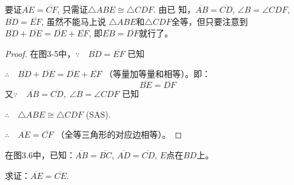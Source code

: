 \begin{analyze}
    要证$\overline{AE}=\overline{CF}$, 只需证$\triangle ABE\cong \triangle CDF$. 由已
知，$\overline{AB}=\overline{CD}$, $\angle B=\angle CDF$, $\overline{BD}=\overline{EF}$, 虽然不能马上说
$\triangle ABE$和$\triangle CDF$全等，但只要注意到$\overline{BD}+\overline{DE}=\overline{DE}+\overline{EF}$, 
即$\overline{EB}=\overline{DF}$就行了。
\end{analyze}

\begin{proof}
    在图3-5中，$\because\quad \overline{BD}=\overline{EF}$ 已知

$\therefore\quad \overline{BD}+\overline{DE}=\overline{DE}+\overline{EF}$ （等量加等量和相等）。即：
\[\overline{BE}=\overline{DF}\]
又$\because\quad \overline{AB}=\overline{CD},\; \angle B =\angle CDF$ 已知

$\therefore\quad \triangle ABE\cong \triangle CDF$ (SAS).

$\therefore\quad \overline{AE}=\overline{CF}$ （全等三角形的对应边相等）。
\end{proof}

\begin{figure}[htp]\centering
    \begin{minipage}[t]{0.48\textwidth}
    \centering
{}
    \caption{ }
    \end{minipage}
    \begin{minipage}[t]{0.48\textwidth}
    \centering
    \caption{ }
    \end{minipage}
    \end{figure}

\begin{example}
    在图3.6中，已知：$\overline{AB}=\overline{BC}$, $\overline{AD}=\overline{CD}$, $E$点在$BD$上。

求证：$\overline{AE}=\overline{CE}$.
\end{example}

